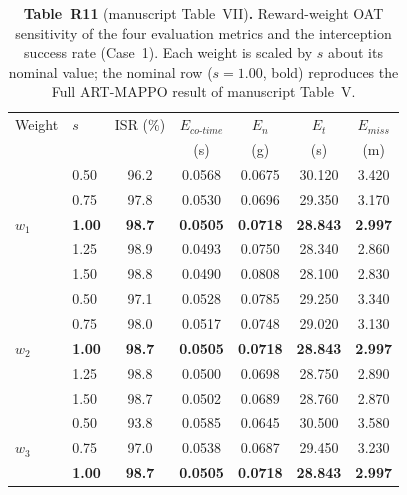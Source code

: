 \documentclass[11pt]{article}
\begin{document}
\begin{table}[h]
\centering
\captionsetup{font=small}
\caption*{\small\textbf{Table~R11} (manuscript Table~VII)\textbf{.} Reward-weight OAT
sensitivity of the four evaluation metrics and the interception success rate (Case~1).
Each weight is scaled by $s$ about its nominal value; the nominal row ($s{=}1.00$, bold)
reproduces the Full ART-MAPPO result of manuscript Table~V.}
\scriptsize
\setlength{\tabcolsep}{3.5pt}
\renewcommand{\arraystretch}{1.12}
\begin{tabular}{llccccc}
\hline\hline
Weight & $s$ & ISR (\%) & $E_{co\text{-}time}$ & $E_n$ & $E_t$ & $E_{miss}$ \\
       &     &          & (s)                  & (g)   & (s)   & (m)       \\ \hline
\multirow{5}{*}{$w_1$}
 & 0.50          & 96.2          & 0.0568          & 0.0675          & 30.120          & 3.420 \\
 & 0.75          & 97.8          & 0.0530          & 0.0696          & 29.350          & 3.170 \\
 & \textbf{1.00} & \textbf{98.7} & \textbf{0.0505} & \textbf{0.0718} & \textbf{28.843} & \textbf{2.997} \\
 & 1.25          & 98.9          & 0.0493          & 0.0750          & 28.340          & 2.860 \\
 & 1.50          & 98.8          & 0.0490          & 0.0808          & 28.100          & 2.830 \\ \hline
\multirow{5}{*}{$w_2$}
 & 0.50          & 97.1          & 0.0528          & 0.0785          & 29.250          & 3.340 \\
 & 0.75          & 98.0          & 0.0517          & 0.0748          & 29.020          & 3.130 \\
 & \textbf{1.00} & \textbf{98.7} & \textbf{0.0505} & \textbf{0.0718} & \textbf{28.843} & \textbf{2.997} \\
 & 1.25          & 98.8          & 0.0500          & 0.0698          & 28.750          & 2.890 \\
 & 1.50          & 98.7          & 0.0502          & 0.0689          & 28.760          & 2.870 \\ \hline
\multirow{5}{*}{$w_3$}
 & 0.50          & 93.8          & 0.0585          & 0.0645          & 30.500          & 3.580 \\
 & 0.75          & 97.0          & 0.0538          & 0.0687          & 29.450          & 3.230 \\
 & \textbf{1.00} & \textbf{98.7} & \textbf{0.0505} & \textbf{0.0718} & \textbf{28.843} & \textbf{2.997} \\

\end{tabular}
\end{table}
\end{document}
